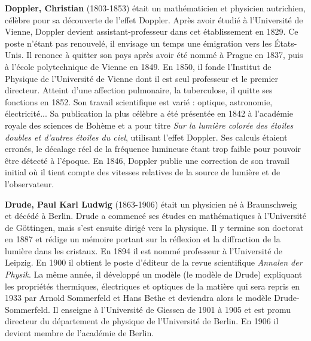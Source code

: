 \textbf{Doppler, Christian} (1803-1853) était un mathématicien et physicien autrichien, célèbre pour sa découverte de l'effet Doppler. Après avoir étudié à l'Université de Vienne, Doppler devient assistant-professeur dans cet établissement en 1829. Ce poste n'étant pas renouvelé, il envisage un temps une émigration vers les États-Unis. Il renonce à quitter son pays après avoir été nommé à Prague en 1837, puis à l'école polytechnique de Vienne en 1849. En 1850, il fonde l'Institut de Physique de l'Université de Vienne dont il est seul professeur et le premier directeur. Atteint d'une affection pulmonaire, la tuberculose, il quitte ses fonctions en 1852. Son travail scientifique est varié : optique, astronomie, électricité... Sa publication la plus célèbre a été présentée en 1842 à l'académie royale des sciences de Bohème et a pour titre \textit{Sur la lumière colorée des étoiles doubles et d'autres étoiles du ciel}, utilisant l'effet Doppler. Ses calculs étaient erronés, le décalage réel de la fréquence lumineuse étant trop faible pour pouvoir être détecté à l'époque. En 1846, Doppler publie une correction de son travail initial où il tient compte des vitesses relatives de la source de lumière et de l'observateur.

\textbf{Drude, Paul Karl Ludwig} (1863-1906) était un physicien né à Braunschweig et décédé à Berlin. Drude a commencé ses études en mathématiques à l'Université de Göttingen, mais s'est ensuite dirigé vers la physique. Il y termine son doctorat en 1887 et rédige un mémoire portant sur la réflexion et la diffraction de la lumière dans les cristaux. En 1894 il est nommé professeur à l'Université de Leipzig. En 1900 il obtient le poste d'éditeur de la revue scientifique \textit{Annalen der Physik}. La même année, il développé un modèle (le modèle de Drude) expliquant les propriétés thermiques, électriques et optiques de la matière qui sera repris en 1933 par Arnold Sommerfeld et Hans Bethe et deviendra alors le modèle Drude-Sommerfeld. Il enseigne à l'Université de Giessen de 1901 à 1905 et est promu directeur du département de physique de l'Université de Berlin. En 1906 il devient membre de l'académie de Berlin.

